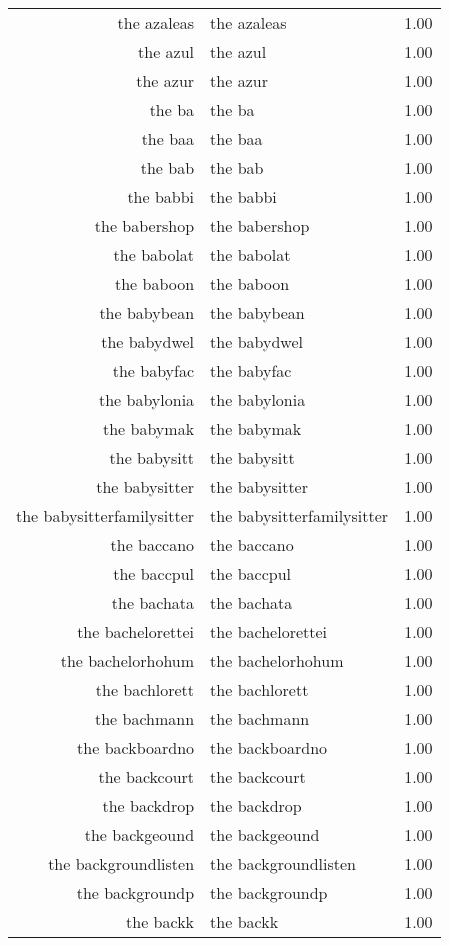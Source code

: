 \begin{table}[ht]
\begin{tabular}{rlr}
  the azaleas & the azaleas & 1.00 \\ 
  the azul & the azul & 1.00 \\ 
  the azur & the azur & 1.00 \\ 
  the ba & the ba & 1.00 \\ 
  the baa & the baa & 1.00 \\ 
  the bab & the bab & 1.00 \\ 
  the babbi & the babbi & 1.00 \\ 
  the babershop & the babershop & 1.00 \\ 
  the babolat & the babolat & 1.00 \\ 
  the baboon & the baboon & 1.00 \\ 
  the babybean & the babybean & 1.00 \\ 
  the babydwel & the babydwel & 1.00 \\ 
  the babyfac & the babyfac & 1.00 \\ 
  the babylonia & the babylonia & 1.00 \\ 
  the babymak & the babymak & 1.00 \\ 
  the babysitt & the babysitt & 1.00 \\ 
  the babysitter & the babysitter & 1.00 \\ 
  the babysitterfamilysitter & the babysitterfamilysitter & 1.00 \\ 
  the baccano & the baccano & 1.00 \\ 
  the baccpul & the baccpul & 1.00 \\ 
  the bachata & the bachata & 1.00 \\ 
  the bachelorettei & the bachelorettei & 1.00 \\ 
  the bachelorhohum & the bachelorhohum & 1.00 \\ 
  the bachlorett & the bachlorett & 1.00 \\ 
  the bachmann & the bachmann & 1.00 \\ 
  the backboardno & the backboardno & 1.00 \\ 
  the backcourt & the backcourt & 1.00 \\ 
  the backdrop & the backdrop & 1.00 \\ 
  the backgeound & the backgeound & 1.00 \\ 
  the backgroundlisten & the backgroundlisten & 1.00 \\ 
  the backgroundp & the backgroundp & 1.00 \\ 
  the backk & the backk & 1.00 \\ 

\end{tabular}
\end{table}
